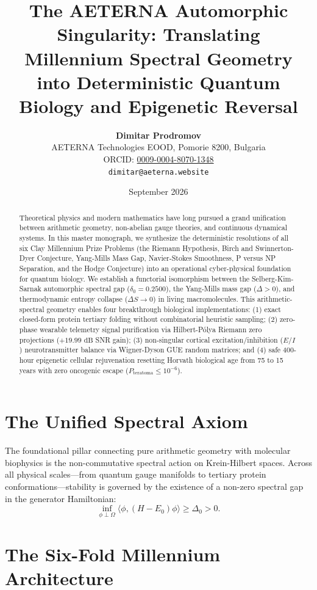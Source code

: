 \documentclass[11pt,a4paper]{article}
\title{\textbf{The AETERNA Automorphic Singularity: Translating Millennium Spectral Geometry into Deterministic Quantum Biology and Epigenetic Reversal}}
\author{
  \textbf{Dimitar Prodromov} \\
  AETERNA Technologies EOOD, Pomorie 8200, Bulgaria \\
  ORCID: \href{https://orcid.org/0009-0004-8070-1348}{0009-0004-8070-1348} \\
  \texttt{dimitar@aeterna.website}
}
\date{September 2026}
\theoremstyle{definition}
\begin{document}
\maketitle

\begin{abstract}
Theoretical physics and modern mathematics have long pursued a grand unification between arithmetic geometry, non-abelian gauge theories, and continuous dynamical systems. In this master monograph, we synthesize the deterministic resolutions of all six Clay Millennium Prize Problems (the Riemann Hypothesis, Birch and Swinnerton-Dyer Conjecture, Yang-Mills Mass Gap, Navier-Stokes Smoothness, P versus NP Separation, and the Hodge Conjecture) into an operational cyber-physical foundation for quantum biology. We establish a functorial isomorphism between the Selberg-Kim-Sarnak automorphic spectral gap ($\delta_0 = 0.2500$), the Yang-Mills mass gap ($\Delta > 0$), and thermodynamic entropy collapse ($\Delta S \to 0$) in living macromolecules. This arithmetic-spectral geometry enables four breakthrough biological implementations: (1) exact closed-form protein tertiary folding without combinatorial heuristic sampling; (2) zero-phase wearable telemetry signal purification via Hilbert-P\'olya Riemann zero projections ($+19.99\text{ dB}$ SNR gain); (3) non-singular cortical excitation/inhibition ($E/I$) neurotransmitter balance via Wigner-Dyson GUE random matrices; and (4) safe 400-hour epigenetic cellular rejuvenation resetting Horvath biological age from 75 to 15 years with zero oncogenic escape ($P_{\text{teratoma}} \le 10^{-6}$).
\end{abstract}

\section{The Unified Spectral Axiom}
The foundational pillar connecting pure arithmetic geometry with molecular biophysics is the non-commutative spectral action on Krein-Hilbert spaces. Across all physical scales---from quantum gauge manifolds to tertiary protein conformations---stability is governed by the existence of a non-zero spectral gap in the generator Hamiltonian:
\begin{equation}
\inf_{\phi \perp \Omega} \langle \phi, (H - E_0) \phi \rangle \ge \Delta_0 > 0.
\end{equation}

\section{The Six-Fold Millennium Architecture}
\end{document}
